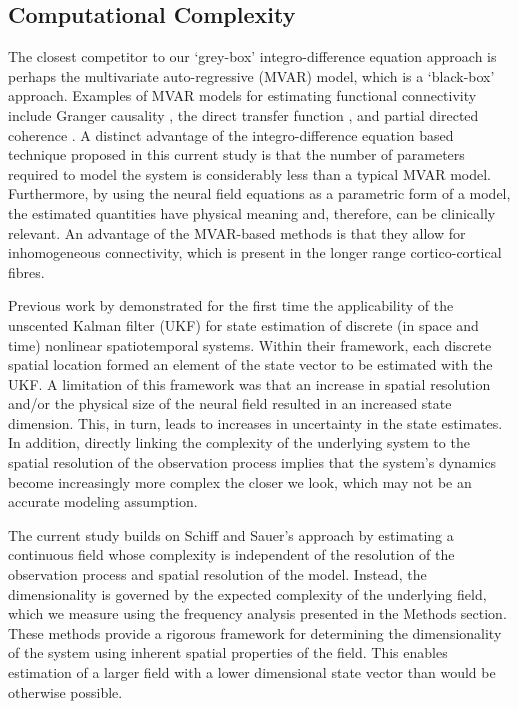\documentclass[review,authoryear,3p]{elsarticle}
\begin{document}
\subsection{Computational Complexity}
The closest competitor to our `grey-box' integro-difference equation approach is perhaps the multivariate auto-regressive (MVAR) model, which is a `black-box' approach. Examples of MVAR models for estimating functional connectivity include Granger causality \citep{Hesse2003}, the direct transfer function \citep{Kaminski1991}, and partial directed coherence \citep{Sameshima1999}. A distinct advantage of the integro-difference equation based technique proposed in this current study is that the number of parameters required to model the system is considerably less than a typical MVAR model. Furthermore, by using the neural field equations as a parametric form of a model, the estimated quantities have physical meaning and, therefore, can be clinically relevant. An advantage of the MVAR-based methods is that they allow for inhomogeneous connectivity, which is present in the longer range cortico-cortical fibres. 

Previous work by \citet{schiff2008kalman} demonstrated for the first time the applicability of the unscented Kalman filter (UKF) for state estimation of discrete (in space and time) nonlinear spatiotemporal systems. Within their framework, each discrete spatial location formed an element of the state vector to be estimated with the UKF. A limitation of this framework was that an increase in spatial resolution and/or the physical size of the neural field resulted in an increased state dimension. This, in turn, leads to increases in uncertainty in the state estimates. In addition, directly linking the complexity of the underlying system to the spatial resolution of the observation process implies that the system's dynamics become increasingly more complex the closer we look, which may not be an accurate modeling assumption.

The current study builds on Schiff and Sauer's approach by estimating a continuous field whose complexity is independent of the resolution of the observation process and spatial resolution of the model. Instead, the dimensionality is governed by the expected complexity of the underlying field, which we measure using the frequency analysis presented in the Methods section. These methods provide a rigorous framework for determining the dimensionality of the system using inherent spatial properties of the field. This enables estimation of a larger field with a lower dimensional state vector than would be otherwise possible. 
\end{document}

